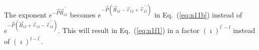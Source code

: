 \documentclass[notitlepage,a4paper,final,amsfonts,amsmath,amssymb]{revtex4-1}
\newcommand{\ket}[1]{\mid #1 \rangle}
\newcommand{\bra}[1]{\langle #1 \mid}
\newcommand{\braket}[2]{\langle #1 \mid #2 \rangle}
\begin{document}
The exponent 
$e^{-\vec{P} \vec{R}_{12}^{\;\prime}}$
becomes 
$e^{-\vec{P} (\vec{R}_{12}-\vec{r}_{12} +\vec{r}_{12}^{\;\prime})}$
in Eq.~(\ref{eq:n11b}) 
instead of 
$e^{-\vec{P} (\vec{R}_{12}+\vec{r}_{12} -\vec{r}_{12}^{\;\prime})}$.
This will result in Eq.~(\ref{eq:n1f1}) in a factor 
$(\imath)^{l^\prime-l}$ instead of
$(\imath)^{l-l^\prime}$.



\end{document}
